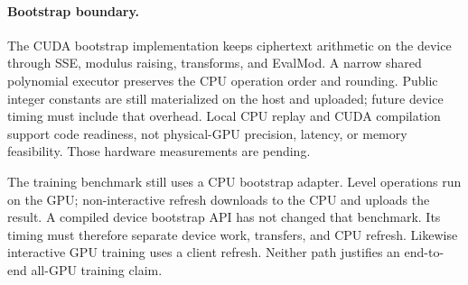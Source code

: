 \paragraph{Bootstrap boundary.}
The CUDA bootstrap implementation keeps ciphertext arithmetic on the device through SSE, modulus raising, transforms, and EvalMod. A narrow shared polynomial executor preserves the CPU operation order and rounding. Public integer constants are still materialized on the host and uploaded; future device timing must include that overhead. Local CPU replay and CUDA compilation support code readiness, not physical-GPU precision, latency, or memory feasibility. Those hardware measurements are pending.

The training benchmark still uses a CPU bootstrap adapter. Level operations run on the GPU; non-interactive refresh downloads to the CPU and uploads the result. A compiled device bootstrap API has not changed that benchmark. Its timing must therefore separate device work, transfers, and CPU refresh. Likewise interactive GPU training uses a client refresh. Neither path justifies an end-to-end all-GPU training claim.

